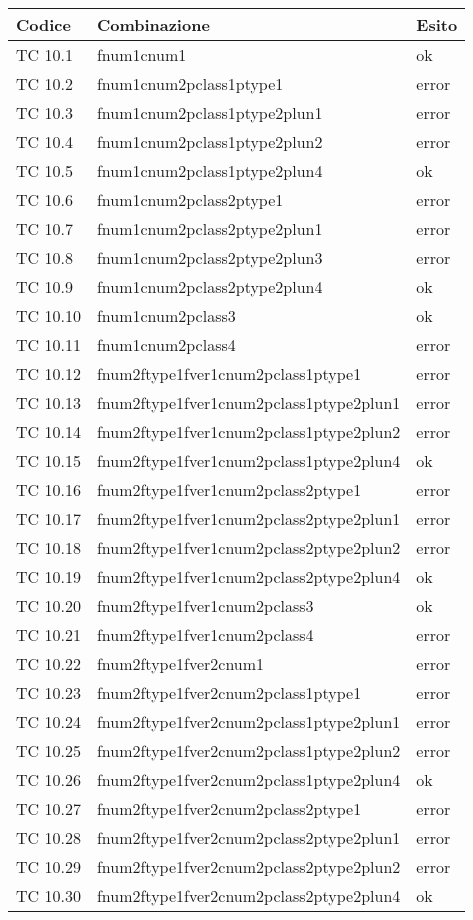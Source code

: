 \vspace{1cm}

\begin{longtable}{|p{3cm}|p{7cm}|p{3cm}|}
	\hline
	\rowcolor{Gray}
	\textbf{Codice} & \textbf{Combinazione} & \textbf{Esito}\tabularnewline
	\hline
	TC 10.1			& fnum1cnum1					& ok \tabularnewline
	\hline
	TC 10.2			& fnum1cnum2pclass1ptype1			& error \tabularnewline
	\hline
	TC 10.3			& fnum1cnum2pclass1ptype2plun1			& error \tabularnewline
	\hline
	TC 10.4			& fnum1cnum2pclass1ptype2plun2			& error \tabularnewline
	\hline
	TC 10.5			& fnum1cnum2pclass1ptype2plun4			& ok \tabularnewline
	\hline
	TC 10.6			& fnum1cnum2pclass2ptype1			& error \tabularnewline
	\hline
	TC 10.7			& fnum1cnum2pclass2ptype2plun1			& error \tabularnewline
	\hline
	TC 10.8			& fnum1cnum2pclass2ptype2plun3			& error \tabularnewline
	\hline
	TC 10.9			& fnum1cnum2pclass2ptype2plun4			& ok \tabularnewline
	\hline
	TC 10.10			& fnum1cnum2pclass3				& ok \tabularnewline
	\hline
	TC 10.11			& fnum1cnum2pclass4				& error \tabularnewline
	\hline
	TC 10.12			& fnum2ftype1fver1cnum2pclass1ptype1		& error \tabularnewline
	\hline
	TC 10.13			& fnum2ftype1fver1cnum2pclass1ptype2plun1	& error \tabularnewline
	\hline
	TC 10.14			& fnum2ftype1fver1cnum2pclass1ptype2plun2	& error \tabularnewline
	\hline
	TC 10.15			& fnum2ftype1fver1cnum2pclass1ptype2plun4	& ok \tabularnewline
	\hline
	TC 10.16			& fnum2ftype1fver1cnum2pclass2ptype1		& error \tabularnewline
	\hline
	TC 10.17			& fnum2ftype1fver1cnum2pclass2ptype2plun1	& error \tabularnewline
	\hline
	TC 10.18			& fnum2ftype1fver1cnum2pclass2ptype2plun2	& error \tabularnewline
	\hline
	TC 10.19			& fnum2ftype1fver1cnum2pclass2ptype2plun4	& ok \tabularnewline
	\hline
	TC 10.20			& fnum2ftype1fver1cnum2pclass3			& ok \tabularnewline
	\hline
	TC 10.21			& fnum2ftype1fver1cnum2pclass4			& error \tabularnewline
	\hline
	TC 10.22			& fnum2ftype1fver2cnum1				& error \tabularnewline
	\hline
	TC 10.23			& fnum2ftype1fver2cnum2pclass1ptype1		& error \tabularnewline
	\hline
	TC 10.24			& fnum2ftype1fver2cnum2pclass1ptype2plun1	& error \tabularnewline
	\hline
	TC 10.25			& fnum2ftype1fver2cnum2pclass1ptype2plun2	& error \tabularnewline
	\hline
	TC 10.26			& fnum2ftype1fver2cnum2pclass1ptype2plun4	& ok \tabularnewline
	\hline
	TC 10.27			& fnum2ftype1fver2cnum2pclass2ptype1		& error \tabularnewline
	\hline
	TC 10.28			& fnum2ftype1fver2cnum2pclass2ptype2plun1	& error \tabularnewline
	\hline
	TC 10.29			& fnum2ftype1fver2cnum2pclass2ptype2plun2	& error \tabularnewline
	\hline
	TC 10.30			& fnum2ftype1fver2cnum2pclass2ptype2plun4	& ok \tabularnewline

\end{longtable}
